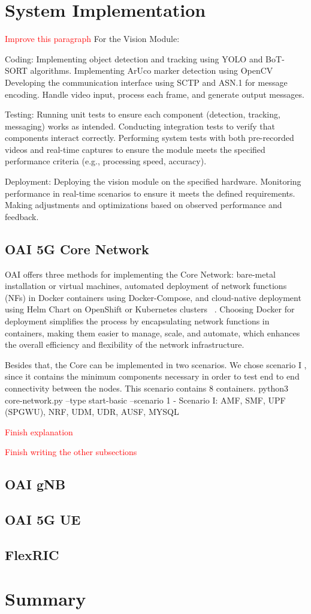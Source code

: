 \section{System Implementation}\label{sec:impl}
\textcolor{red}{Improve this paragraph}
For the Vision Module:

    Coding:
        Implementing object detection and tracking using YOLO and BoT-SORT algorithms.
        Implementing ArUco marker detection using OpenCV
        Developing the communication interface using SCTP and ASN.1 for message encoding.
        Handle video input, process each frame, and generate output messages.

    Testing:
        Running unit tests to ensure each component (detection, tracking, messaging) works as intended.
        Conducting integration tests to verify that components interact correctly.
        Performing system tests with both pre-recorded videos and real-time captures to ensure the module meets the specified performance criteria (e.g., processing speed, accuracy).

    Deployment:
        Deploying the vision module on the specified hardware.
        Monitoring performance in real-time scenarios to ensure it meets the defined requirements.
        Making adjustments and optimizations based on observed performance and feedback.

\subsection{OAI 5G Core Network}
OAI offers three methods for implementing the Core Network: bare-metal installation or virtual machines, automated deployment of network functions (NFs) in Docker containers using Docker-Compose, and cloud-native deployment using Helm Chart on OpenShift or Kubernetes clusters ~\cite{}.
Choosing Docker for deployment simplifies the process by encapsulating network functions in containers, making them easier to manage, scale, and automate, which enhances the overall efficiency and flexibility of the network infrastructure.

Besides that, the Core can be implemented in two scenarios.
We chose scenario I , since it contains the minimum components necessary in order to test end to end connectivity between the nodes.
This scenario contains 8 containers.
python3 core-network.py --type start-basic --scenario 1
- Scenario I:  AMF, SMF, UPF (SPGWU), NRF, UDM, UDR, AUSF, MYSQL

\textcolor{red}{Finish explanation}

\textcolor{red}{Finish writing the other subsections}
\subsection{OAI gNB}
\subsection{OAI 5G UE}
\subsection{FlexRIC}


\section{Summary}







